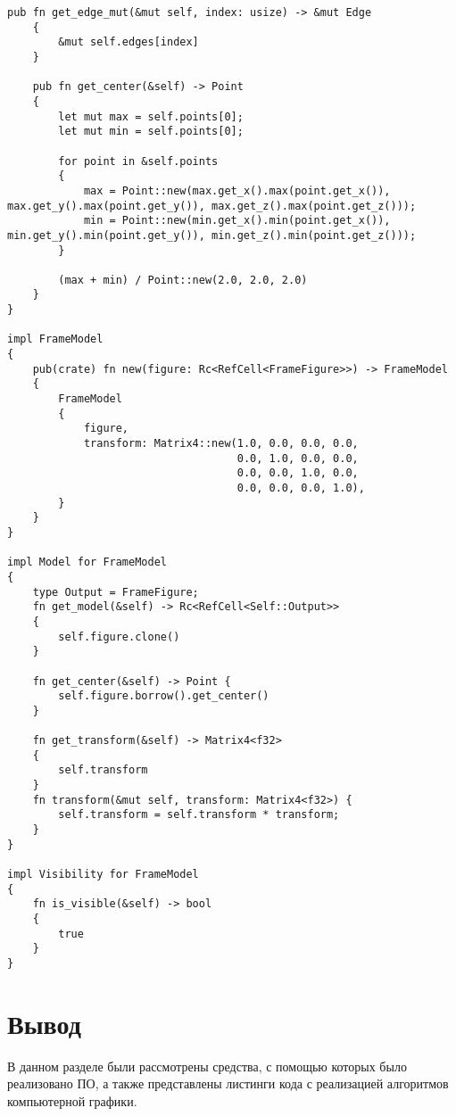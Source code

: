 \begin{lstlisting}[style=rust, label=lst:frame_model, caption={Реализация проволочной модели}]
    pub fn get_edge_mut(&mut self, index: usize) -> &mut Edge
    {
        &mut self.edges[index]
    }

    pub fn get_center(&self) -> Point
    {
        let mut max = self.points[0];
        let mut min = self.points[0];

        for point in &self.points
        {
            max = Point::new(max.get_x().max(point.get_x()), max.get_y().max(point.get_y()), max.get_z().max(point.get_z()));
            min = Point::new(min.get_x().min(point.get_x()), min.get_y().min(point.get_y()), min.get_z().min(point.get_z()));
        }

        (max + min) / Point::new(2.0, 2.0, 2.0)
    }
}

impl FrameModel
{
    pub(crate) fn new(figure: Rc<RefCell<FrameFigure>>) -> FrameModel
    {
        FrameModel
        {
            figure,
            transform: Matrix4::new(1.0, 0.0, 0.0, 0.0,
                                    0.0, 1.0, 0.0, 0.0,
                                    0.0, 0.0, 1.0, 0.0,
                                    0.0, 0.0, 0.0, 1.0),
        }
    }
}

impl Model for FrameModel
{
    type Output = FrameFigure;
    fn get_model(&self) -> Rc<RefCell<Self::Output>>
    {
        self.figure.clone()
    }

    fn get_center(&self) -> Point {
        self.figure.borrow().get_center()
    }

    fn get_transform(&self) -> Matrix4<f32>
    {
        self.transform
    }
    fn transform(&mut self, transform: Matrix4<f32>) {
        self.transform = self.transform * transform;
    }
}

impl Visibility for FrameModel
{
    fn is_visible(&self) -> bool
    {
        true
    }
}
\end{lstlisting}
\section*{Вывод}

В данном разделе были рассмотрены средства, с помощью которых было реализовано ПО, а также представлены листинги кода с реализацией алгоритмов компьютерной графики.


